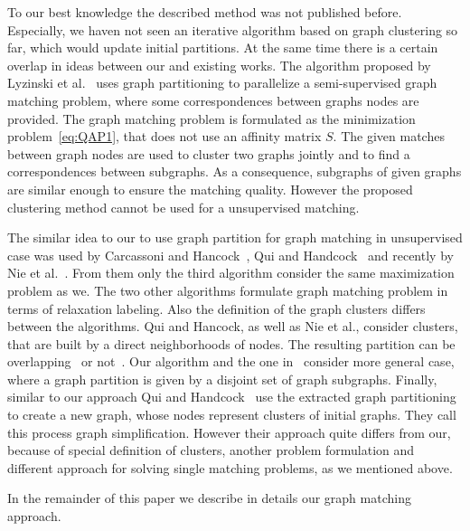 To our best knowledge the described method was not published before. Especially, we haven not seen an iterative algorithm based on graph clustering so far, which would update initial partitions. At the same time there is a certain overlap in ideas between our and existing works. The algorithm proposed by Lyzinski et al.~\cite{Lyzinski2015} uses graph partitioning to parallelize a semi-supervised graph matching problem, where some correspondences between graphs nodes are provided. The graph matching problem is formulated as the minimization problem~\eqref{eq:QAP1}, that does not use an affinity matrix $S$. The given matches between graph nodes are used to cluster two graphs jointly and to find a correspondences between subgraphs. As a consequence, subgraphs of given graphs are similar enough to ensure the matching quality. However the proposed clustering method cannot be used for a unsupervised matching.

The similar idea to our to use graph partition for graph matching in unsupervised case was used by Carcassoni and Hancock~\cite{Hancock_ModalClusters}, Qui and Handcock~\cite{Hancock_GM_SpectralPart} and recently by Nie et al.~\cite{CliqueGraph_CVPR2015}. From them only the third algorithm consider the same maximization problem as we. The two other algorithms formulate graph matching problem in terms of relaxation labeling. Also the definition of the graph clusters differs between the algorithms. Qui and Hancock, as well as Nie et al., consider clusters, that are built by a direct neighborhoods of nodes. The resulting partition can be overlapping~\cite{CliqueGraph_CVPR2015} or not~\cite{Hancock_GM_SpectralPart}. Our algorithm and the one in~\cite{Hancock_ModalClusters} consider more general case, where a graph partition is given by a disjoint set of graph subgraphs.
Finally, similar to our approach Qui and Handcock~\cite{Hancock_GM_SpectralPart} use the extracted graph partitioning to create a new graph, whose nodes represent clusters of initial graphs. They call this process graph simplification. However their approach quite differs from our, because of special definition of clusters, another problem formulation and different approach for solving single matching problems, as we mentioned above.

In the remainder of this paper we describe in details our graph matching approach.

